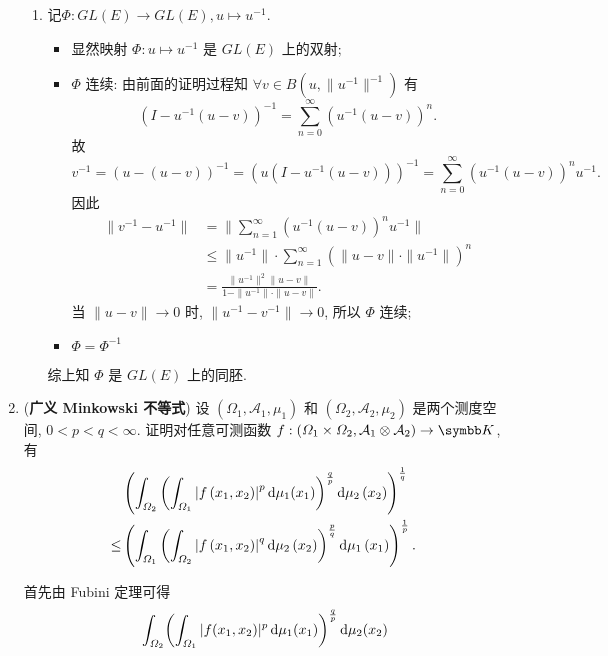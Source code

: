 \begin{enumerate}
\begin{answer}
\begin{enumerate}
        \item 记$\Phi:GL(E)\to GL(E),u\mapsto u^{-1}$.
        \begin{itemize}
        \item 显然映射 $\Phi:u\mapsto u^{-1}$ 是 $GL(E)$ 上的双射;
        \item $\Phi$ 连续: 由前面的证明过程知 $\forall v\in B(u,\|u^{-1}\|^{-1})$ 有
        \[(I-u^{-1}(u-v))^{-1}=\sum_{n=0}^{\infty}(u^{-1}(u-v))^n.\]
        故
        \[v^{-1}=(u-(u-v))^{-1}=(u(I-u^{-1}(u-v)))^{-1}=\sum_{n=0}^{\infty}(u^{-1}(u-v))^nu^{-1}.\]
        因此
        \[\begin{split}
        \|v^{-1}-u^{-1}\|
        &=\|\sum_{n=1}^{\infty}(u^{-1}(u-v))^nu^{-1}\|\\
        &\leq\|u^{-1}\|\cdot\sum_{n=1}^{\infty}(\|u-v\|\cdot\|u^{-1}\|)^n\\
        &=\frac{\|u^{-1}\|^2\|u-v\|}{1-\|u^{-1}\|\cdot\|u-v\|}.
        \end{split}\]
        当 $\|u-v\|\to 0$ 时, $\|u^{-1}-v^{-1}\|\to 0$, 所以 $\Phi$ 连续;
        \item $\Phi=\Phi^{-1}$
        \end{itemize}
        综上知 $\Phi$ 是 $GL(E)$ 上的同胚.
      \end{enumerate}
    \end{answer}
  \item (\textbf{广义 Minkowski 不等式}) 
  设 $\left(\varOmega_{1}, \mathcal{A}_{1}, \mu_{1}\right)$ 
  和 $\left(\varOmega_{2}, \mathcal{A}_{2}, \mu_{2}\right)$ 是两个测度空间, $0<p<q<\infty$. 
  证明对任意可测函数 
    $f:\left(\varOmega_{1} \times \varOmega_{2}, \mathcal{A}_{1} \otimes \mathcal{A}_{2}\right) \rightarrow\K$, 有
    \begin{align*}
        &\left(\int_{\varOmega_{2}}\left(\int_{\varOmega_{1}}\left|f\left(x_{1}, x_{2}\right)\right|^{p}\mathop{}\!\mathrm{d}\mu_{1}(x_{1})\right)^{\frac{q}{p}}\mathop{}\!\mathrm{d} \mu_{2}\left(x_{2}\right)\right)^{\frac{1}{q}} \\
      \leq &\left(\int_{\varOmega_{1}}\left(\int_{\varOmega_{2}}\left|f\left(x_{1}, x_{2}\right)\right|^{q}\mathop{}\!\mathrm{d}\mu_{2}\left(x_{2}\right)\right)^{\frac{p}{q}}\mathop{}\!\mathrm{d}\mu_{1}\left(x_{1}\right)\right)^{\frac{1}{p}}.
    \end{align*}
    \begin{answer}
      首先由 Fubini 定理可得
      \begin{align*}
          & \int_{\varOmega_2}\biggl(\int_{\varOmega_1}|f(x_1,x_2)|^p\diff\mu_1(x_1)\biggr)^{\frac{q}{p}}\diff\mu_2(x_2) \\

\end{align*}
\end{answer}
\end{enumerate}
